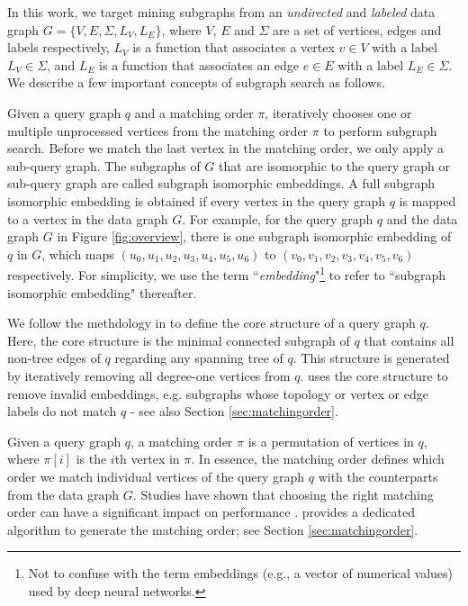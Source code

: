 In this work, we target mining subgraphs from an \emph{undirected} and \emph{labeled} data graph $G=\{V,E,\Sigma,L_V,L_E\}$, where $V$, $E$
and $\Sigma$ are a set of vertices, edges and labels respectively,  $L_V$ is a function that associates a vertex $v \in V$ with a label
$L_V \in \Sigma$, and $L_E$ is a function that associates an edge $e \in E$ with a label $L_E \in \Sigma$. We describe a few important concepts of subgraph search as follows.

 Given a query graph $q$ and a matching order $\pi$, \SystemName iteratively chooses  one or multiple unprocessed
vertices from the matching order $\pi$ to perform subgraph search. Before we match the last vertex in the matching order, we only apply a
sub-query graph. The subgraphs of $G$ that are isomorphic to the query graph or sub-query graph are called subgraph isomorphic embeddings.
A full subgraph isomorphic embedding is obtained if every vertex in the query graph $q$ is mapped to a vertex in the data graph $G$. For
example, for the query graph $q$ and the data graph $G$ in Figure \ref{fig:overview}, there is one subgraph isomorphic embedding of $q$ in
$G$, which maps $(u_0, u_1, u_2, u_3, u_4, u_5, u_6)$ to $(v_0, v_1, v_2, v_3, v_4, v_5, v_6)$ respectively. For simplicity, we use the
term ``\emph{embedding}"\footnote{Not to confuse with the term embeddings (e.g., a vector of numerical values) used by deep neural
networks.} to refer to ``subgraph isomorphic embedding" thereafter.

 We follow the methdology in \cite{bi2016efficient} to define the core structure of a query graph $q$.
Here, the core structure is the minimal connected subgraph of $q$ that contains all non-tree edges of $q$ regarding any spanning tree of
$q$. This structure is generated by iteratively removing all degree-one vertices from $q$. \SystemName uses the core structure to remove
invalid embeddings, e.g. subgraphs whose topology or vertex or edge labels do not match $q$ - see also Section \ref{sec:matchingorder}.


 Given a query graph $q$, a matching order $\pi$ is a permutation of vertices in $q$, where $\pi[i]$ is the
$i$th vertex in $\pi$. In essence, the matching order defines which order we match individual vertices of the query graph $q$ with the
counterparts from the data graph $G$. Studies have shown that choosing the right matching order can have a significant impact on
performance \cite{bi2016efficient,sun2020subgraph,sun2020rapidmatch,guo2020gpu}.  \SystemName provides a dedicated algorithm to generate
the matching order; see Section \ref {sec:matchingorder}.



